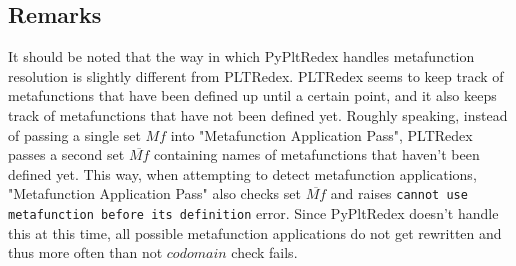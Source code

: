 \subsection{Remarks}
It should be noted that the way in which PyPltRedex handles metafunction resolution is slightly different from PLTRedex. PLTRedex seems to keep track of metafunctions that have been defined up until a certain point, and it also keeps track of metafunctions that have not been defined yet. Roughly speaking, instead of passing a single set $Mf$ into "Metafunction Application Pass", PLTRedex passes a second set $\overline{Mf}$ containing names of metafunctions that haven't been defined yet. This way, when attempting to detect metafunction applications, "Metafunction Application Pass" also checks set $\overline{Mf}$ and raises \lstinline{cannot use metafunction before its definition} error. Since PyPltRedex doesn't handle this at this time, all possible metafunction applications do not get rewritten and thus more often than not $codomain$ check fails.
